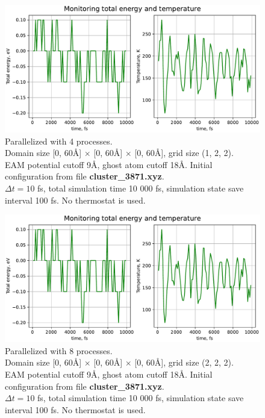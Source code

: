 \documentclass[12pt,a4paper]{article}
\begin{document}
\begin{figure}[h!]
	\centering
	\includegraphics[width=.85\linewidth]{img/milestone08-4proc.pdf}
	\caption{Parallelized with 4 processes.\\
	Domain size [0, 60Å] $\times$ [0, 60Å] $\times$ [0, 60Å], grid size (1, 2, 2).\\
	EAM potential cutoff 9Å, ghost atom cutoff 18Å. Initial configuration from file {\bf cluster\_3871.xyz}.\\
	$\Delta t = 10$ fs, total simulation time 10 000 fs, simulation state save interval 100 fs. No thermostat is used.}
	\label{fig:parallel-2}
\end{figure}

\clearpage

\begin{figure}[h!]
	\centering
	\includegraphics[width=.85\linewidth]{img/milestone08-8proc.pdf}
	\caption{Parallelized with 8 processes.\\
	Domain size [0, 60Å] $\times$ [0, 60Å] $\times$ [0, 60Å], grid size (2, 2, 2).\\
	EAM potential cutoff 9Å, ghost atom cutoff 18Å. Initial configuration from file {\bf cluster\_3871.xyz}.\\
	$\Delta t = 10$ fs, total simulation time 10 000 fs, simulation state save interval 100 fs. No thermostat is used.}
	\label{fig:parallel-3}
\end{figure}
\end{document}
